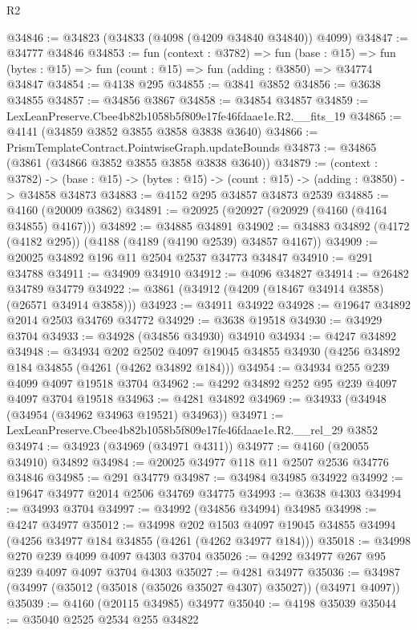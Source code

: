 \begin{lexlean}{R2}
\begin{coremodule}
@34846 := @34823 (@34833 (@4098 (@4209 @34840 @34840)) @4099)
@34847 := @34777 @34846
@34853 := fun (context : @3782) =>
  fun (base : @15) =>
  fun (bytes : @15) => fun (count : @15) => fun (adding : @3850) => @34774 @34847
@34854 := @4138 @295
@34855 := @3841 @3852
@34856 := @3638 @34855
@34857 := @34856 @3867
@34858 := @34854 @34857
@34859 := LexLeanPreserve.Cbee4b82b1058b5f809e17fe46fdaae1e.R2.__fits_19
@34865 := @4141 (@34859 @3852 @3855 @3858 @3838 @3640)
@34866 := PrismTemplateContract.PointwiseGraph.updateBounds
@34873 := @34865 (@3861 (@34866 @3852 @3855 @3858 @3838 @3640))
@34879 := (context : @3782) ->
  (base : @15) -> (bytes : @15) -> (count : @15) -> (adding : @3850) -> @34858 @34873
@34883 := @4152 @295 @34857 @34873 @2539
@34885 := @4160 (@20009 @3862)
@34891 := @20925 (@20927 (@20929 (@4160 (@4164 @34855) @4167)))
@34892 := @34885 @34891
@34902 := @34883 @34892 (@4172 (@4182 @295)) (@4188 (@4189 (@4190 @2539) @34857 @4167))
@34909 := @20025 @34892 @196 @11 @2504 @2537 @34773 @34847
@34910 := @291 @34788
@34911 := @34909 @34910
@34912 := @4096 @34827
@34914 := @26482 @34789 @34779
@34922 := @3861 (@34912 (@4209 (@18467 @34914 @3858) (@26571 @34914 @3858)))
@34923 := @34911 @34922
@34928 := @19647 @34892 @2014 @2503 @34769 @34772
@34929 := @3638 @19518
@34930 := @34929 @3704
@34933 := @34928 (@34856 @34930) @34910
@34934 := @4247 @34892
@34948 := @34934
    @202
    @2502
    @4097
    @19045
    @34855
    @34930
    (@4256 @34892 @184 @34855 (@4261 (@4262 @34892 @184)))
@34954 := @34934 @255 @239 @4099 @4097 @19518 @3704
@34962 := @4292 @34892 @252 @95 @239 @4097 @4097 @3704 @19518
@34963 := @4281 @34892
@34969 := @34933 (@34948 (@34954 (@34962 @34963 @19521) @34963))
@34971 := LexLeanPreserve.Cbee4b82b1058b5f809e17fe46fdaae1e.R2.__rel_29 @3852
@34974 := @34923 (@34969 (@34971 @4311))
@34977 := @4160 (@20055 @34910) @34892
@34984 := @20025 @34977 @118 @11 @2507 @2536 @34776 @34846
@34985 := @291 @34779
@34987 := @34984 @34985 @34922
@34992 := @19647 @34977 @2014 @2506 @34769 @34775
@34993 := @3638 @4303
@34994 := @34993 @3704
@34997 := @34992 (@34856 @34994) @34985
@34998 := @4247 @34977
@35012 := @34998
    @202
    @1503
    @4097
    @19045
    @34855
    @34994
    (@4256 @34977 @184 @34855 (@4261 (@4262 @34977 @184)))
@35018 := @34998 @270 @239 @4099 @4097 @4303 @3704
@35026 := @4292 @34977 @267 @95 @239 @4097 @4097 @3704 @4303
@35027 := @4281 @34977
@35036 := @34987 (@34997 (@35012 (@35018 (@35026 @35027 @4307) @35027)) (@34971 @4097))
@35039 := @4160 (@20115 @34985) @34977
@35040 := @4198 @35039
@35044 := @35040 @2525 @2534 @255 @34822

\end{coremodule}
\end{lexlean}
